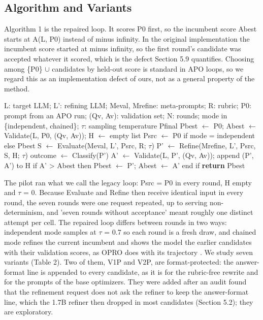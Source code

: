 \documentclass{ieeeaccess}
\begin{document}
\subsection{Algorithm and Variants}

Algorithm 1 is the repaired loop. It scores P0 first, so the incumbent score Abest starts at A(L, P0) instead of minus infinity. In the original implementation the incumbent score started at minus infinity, so the first round's candidate was accepted whatever it scored, which is the defect Section 5.9 quantifies. Choosing among \{P0\} $\cup$ candidates by held-out score is standard in APO loops, so we regard this as an implementation defect of ours, not as a general property of the method.

\begin{algorithm}[htbp]
\caption{MPIR with a validation gate (repaired)}
\begin{algorithmic}[1]
\Require L: target LLM; L': refining LLM; Meval, Mrefine: meta-prompts; R: rubric; P0: prompt from an APO run; (Qv, Av): validation set; N: rounds; mode in \{independent, chained\}; $\tau$: sampling temperature
\Ensure Pfinal
\State Pbest $\leftarrow$ P0; Abest $\leftarrow$ Validate(L, P0, (Qv, Av)); H $\leftarrow$ empty list 
\State Psrc $\leftarrow$ P0 if mode = independent else Pbest
\State S $\leftarrow$ Evaluate(Meval, L', Psrc, R; $\tau$) 
\State P' $\leftarrow$ Refine(Mrefine, L', Psrc, S, H; $\tau$) 
\State outcome $\leftarrow$ Classify(P') 
\State A' $\leftarrow$ Validate(L, P', (Qv, Av)); append (P', A') to H
\State if A' > Abest then Pbest $\leftarrow$ P'; Abest $\leftarrow$ A' end if 
\EndIf
\EndFor
\State \textbf{return} Pbest
\end{algorithmic}
\end{algorithm}

The pilot ran what we call the legacy loop: Psrc = P0 in every round, H empty and $\tau$ = 0. Because Evaluate and Refine then receive identical input in every round, the seven rounds were one request repeated, up to serving non-determinism, and 'seven rounds without acceptance' meant roughly one distinct attempt per cell. The repaired loop differs between rounds in two ways: independent mode samples at $\tau$ = 0.7 so each round is a fresh draw, and chained mode refines the current incumbent and shows the model the earlier candidates with their validation scores, as OPRO does with its trajectory \cite{yang2024}. We study seven variants (Table 2). Two of them, V1P and V2P, are format-protected: the answer-format line is appended to every candidate, as it is for the rubric-free rewrite and for the prompts of the base optimizers. They were added after an audit found that the refinement request does not ask the refiner to keep the answer-format line, which the 1.7B refiner then dropped in most candidates (Section 5.2); they are exploratory.
\end{document}
